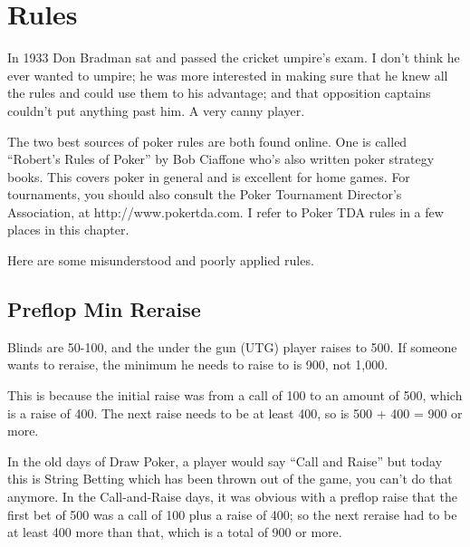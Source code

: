 \chapter{Rules}


In 1933 Don Bradman sat and passed the cricket umpire's exam. I don't
think he ever wanted to umpire; he was more interested in making
sure that he knew all the rules and could use them to his advantage;
and that opposition captains couldn't put anything past him. A very
canny player.

The two best sources of poker rules are both found online.
One is called ``Robert's Rules of Poker'' by Bob Ciaffone
who's also written poker strategy books. This covers
poker in general and is excellent for home games. For tournaments,
you should also consult the Poker Tournament Director's Association,
at http://www.pokertda.com. I refer to Poker TDA rules in a few
places in this chapter.



Here are some misunderstood and poorly applied rules.

\section{Preflop Min Reraise}

Blinds are 50-100, and the under the gun (UTG) player
raises to 500. If someone wants to reraise, the minimum
he needs to raise to is 900, not 1,000. 

This is because the initial raise was from a call of 100 to an
amount of 500, which is a raise of 400. The next raise needs
to be at least 400, so is 500 + 400 = 900 or more.


In the old days of Draw Poker, a player would say ``Call and Raise''
but today this is String Betting which has been thrown out of the
game, you can't do that anymore. In the Call-and-Raise days, it was obvious
with a preflop raise that the first bet of 500 was a call of 100 plus
a raise of 400; so the next reraise had to be at least 400 more than
that, which is a total of 900 or more.

